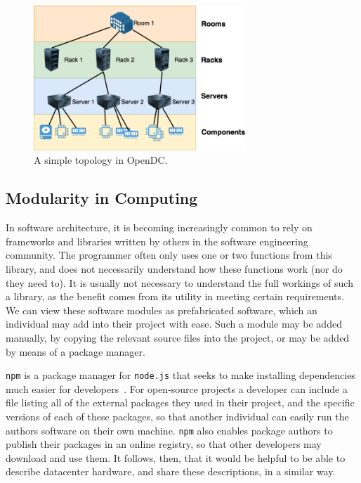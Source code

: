 \documentclass[11pt]{article}
\begin{document}
		\begin{figure}[]
			\centering
			\includegraphics[width=8cm]{opendc-topology.png}
			\caption[A simple topology in OpenDC]{A simple topology in OpenDC.}
			\label{fig:example-opendc-topology}
		\end{figure}
	
	\subsection{Modularity in Computing}
		In software architecture, it is becoming increasingly common to rely on frameworks and libraries written by others in the software engineering community. 
		The programmer often only uses one or two functions from this library, and does not necessarily understand how these functions work (nor do they need to).
		It is usually not necessary to understand the full workings of such a library, as the benefit comes from its utility in meeting certain requirements. 
		We can view these software modules as prefabricated software, which an individual may add into their project with ease. 
		Such a module may be added manually, by copying the relevant source files into the project, or may be added by means of a package manager.
		
		\verb|npm| is a package manager for \verb|node.js| that seeks to make installing dependencies much easier for developers~\cite{Wittern2016}.
		For open-source projects a developer can include a file listing all of the external packages they used in their project, and the specific versions of each of these packages, so that another individual can easily run the authors software on their own machine.
		\verb|npm| also enables package authors to publish their packages in an online registry, so that other developers may download and use them.
		It follows, then, that it would be helpful to be able to describe datacenter hardware, and share these descriptions, in a similar way. 
\end{document}
